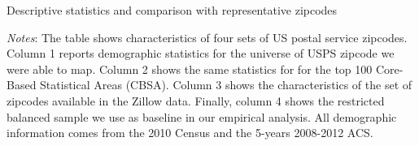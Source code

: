 \begin{table}[h!]
	\caption{Descriptive statistics and comparison with representative zipcodes}
	\centering
	\label{tab:estimating_panel_stats}    
	
	\begin{minipage}{0.95\textwidth} \footnotesize
		\vspace{3mm} 
		\textit{Notes}: The table shows characteristics of four sets of US postal service zipcodes.
		Column 1 reports demographic statistics for the universe of USPS zipcode we were able to 
		map. Column 2 shows the same statistics for for the top 100 Core-Based Statistical Areas 
		(CBSA). Column 3 shows the characteristics of the set of zipcodes available in the Zillow 
		data. Finally, column 4 shows the restricted balanced sample we use as baseline in our 
		empirical analysis. All demographic information comes from the 2010 Census and the 5-years 
		2008-2012 ACS.
	\end{minipage}
\end{table}
